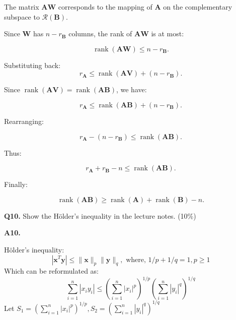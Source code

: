 \documentclass[12pt]{article}
\newcommand{\bmat}[1]{\mathbf{#1}} %
\begin{document}
\begin{itemize}
The matrix \( \mathbf{A}\mathbf{W} \) corresponds to the mapping of \( \mathbf{A} \) on the complementary subspace to \( \mathcal{R}(\mathbf{B}) \). 

Since \( \mathbf{W} \) has \( n - r_{\mathbf{B}} \) columns, the rank of \( \mathbf{A}\mathbf{W} \) is at most:

\[
\operatorname{rank}(\mathbf{A}\mathbf{W}) \leq n - r_{\mathbf{B}}.
\]

 Substituting back:
\[
r_{\mathbf{A}} \leq \operatorname{rank}(\mathbf{A}\mathbf{V}) + (n - r_{\mathbf{B}}).
\]

Since \( \operatorname{rank}(\mathbf{A}\mathbf{V}) = \operatorname{rank}(\mathbf{A}\mathbf{B}) \), we have:

\[
r_{\mathbf{A}} \leq \operatorname{rank}(\mathbf{A}\mathbf{B}) + (n - r_{\mathbf{B}}).
\]

Rearranging:

\[
r_{\mathbf{A}} - (n - r_{\mathbf{B}}) \leq \operatorname{rank}(\mathbf{A}\mathbf{B}).
\]

Thus:

\[
r_{\mathbf{A}} + r_{\mathbf{B}} - n \leq \operatorname{rank}(\mathbf{A}\mathbf{B}).
\]

Finally:

\[
\operatorname{rank}(\mathbf{A}\mathbf{B}) \geq \operatorname{rank}(\mathbf{A}) + \operatorname{rank}(\mathbf{B}) - n.
\]

\end{itemize}







\vspace{\baselineskip}


\vspace{\baselineskip}
\hline
\vspace{\baselineskip}

\textbf{Q10.} Show the Hölder's inequality in the lecture notes. \hfill (10\%)
\vspace{\baselineskip}

\textbf{A10.} 
\vspace{\baselineskip}

Hölder's inequality:
\[
|\bmat{x}^T\bmat{y}| \le \|\bmat{x}\|_p\|\bmat{y}\|_q, \text{ where, } 1/p+1/q =1, p \ge 1
\]
Which can be reformulated as:
\[
\sum_{i=1}^n |x_iy_i| \le \left(\sum_{i=1}^n |x_i|^p \right)^{1/p} \left(\sum_{i=1}^n |y_i|^q \right)^{1/q}
\]
Let $S_1 = \left(\sum_{i=1}^n |x_i|^p \right)^{1/p}, S_2=  \left(\sum_{i=1}^n |y_i|^q \right)^{1/q}$ 
\vspace{\baselineskip}
\end{document}
